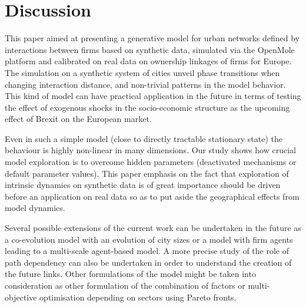 \documentclass[11pt]{article}
\begin{document}
\section{Discussion}

This paper aimed at presenting a generative model for urban networks defined by interactions between firms based on synthetic data, simulated via the OpenMole platform and calibrated on real data on ownership linkages of firms for Europe. The simulation on a synthetic system of cities unveil phase transitions when changing interaction distance, and non-trivial patterns in the model behavior. This kind of model can have practical application in the future in terms of testing the effect of exogenous shocks in the socio-economic structure as the upcoming effect of Brexit on the European market.

Even in such a simple model (close to directly tractable stationary state) the behaviour is highly non-linear in many dimensions. Our study shows how crucial model exploration is to overcome hidden parameters (deactivated mechanisms or default parameter values). This paper emphasis on the fact that exploration of intrinsic dynamics on synthetic data is of great importance should be driven before an application on real data so as to put aside the geographical effects from model dynamics.

Several possible extensions of the current work can be undertaken in the future as a co-evolution model with an evolution of city sizes or a model with firm agents leading to a multi-scale agent-based model. A more precise study of the role of path dependency can also be undertaken in order to understand the creation of the future links. Other formulations of the model might be taken into consideration as other formulation of the combination of factors or multi-objective optimisation depending on sectors using Pareto fronts.  





%

\end{document}

